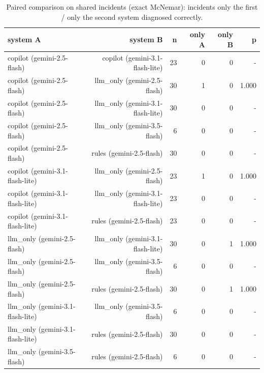 \begin{table}[t]
\centering\small
\caption{Paired comparison on shared incidents (exact McNemar): incidents only the first / only the second system diagnosed correctly.}\label{tab:rq2_pairwise}
\begin{tabular}{lrrrrr}
\toprule
system A & system B & n & only A & only B & p \\
\midrule
copilot (gemini-2.5-flash) & copilot (gemini-3.1-flash-lite) & 23 & 0 & 0 & - \\
copilot (gemini-2.5-flash) & llm\_only (gemini-2.5-flash) & 30 & 1 & 0 & 1.000 \\
copilot (gemini-2.5-flash) & llm\_only (gemini-3.1-flash-lite) & 30 & 0 & 0 & - \\
copilot (gemini-2.5-flash) & llm\_only (gemini-3.5-flash) & 6 & 0 & 0 & - \\
copilot (gemini-2.5-flash) & rules (gemini-2.5-flash) & 30 & 0 & 0 & - \\
copilot (gemini-3.1-flash-lite) & llm\_only (gemini-2.5-flash) & 23 & 1 & 0 & 1.000 \\
copilot (gemini-3.1-flash-lite) & llm\_only (gemini-3.1-flash-lite) & 23 & 0 & 0 & - \\
copilot (gemini-3.1-flash-lite) & rules (gemini-2.5-flash) & 23 & 0 & 0 & - \\
llm\_only (gemini-2.5-flash) & llm\_only (gemini-3.1-flash-lite) & 30 & 0 & 1 & 1.000 \\
llm\_only (gemini-2.5-flash) & llm\_only (gemini-3.5-flash) & 6 & 0 & 0 & - \\
llm\_only (gemini-2.5-flash) & rules (gemini-2.5-flash) & 30 & 0 & 1 & 1.000 \\
llm\_only (gemini-3.1-flash-lite) & llm\_only (gemini-3.5-flash) & 6 & 0 & 0 & - \\
llm\_only (gemini-3.1-flash-lite) & rules (gemini-2.5-flash) & 30 & 0 & 0 & - \\
llm\_only (gemini-3.5-flash) & rules (gemini-2.5-flash) & 6 & 0 & 0 & - \\
\bottomrule
\end{tabular}
\end{table}
